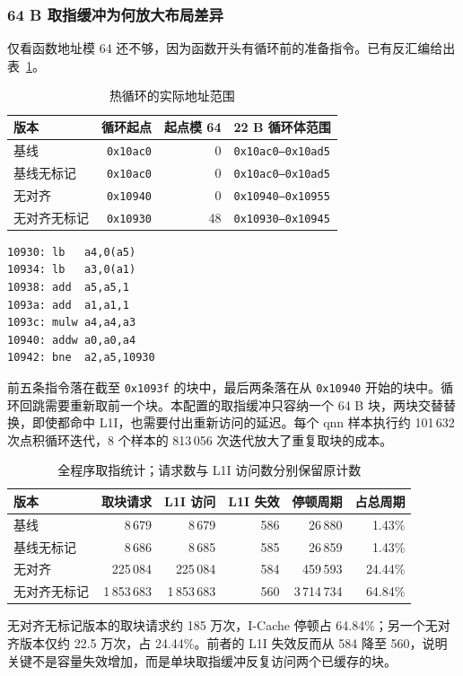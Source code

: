 \documentclass[12pt,a4paper,fontset=mac]{ctexart}
\begin{document}
\subsubsection{64 B 取指缓冲为何放大布局差异}
仅看函数地址模 64 还不够，因为函数开头有循环前的准备指令。已有反汇编给出表~\ref{tab:loop}。
\begin{table}[H]\centering\small
\caption{热循环的实际地址范围}\label{tab:loop}
\begin{tabular}{lrrl}\toprule
版本 & 循环起点 & 起点模 64 & 22 B 循环体范围 \\\midrule
基线 & \texttt{0x10ac0} & 0 & \texttt{0x10ac0--0x10ad5} \\
基线无标记 & \texttt{0x10ac0} & 0 & \texttt{0x10ac0--0x10ad5} \\
无对齐 & \texttt{0x10940} & 0 & \texttt{0x10940--0x10955} \\
无对齐无标记 & \texttt{0x10930} & 48 & \texttt{0x10930--0x10945} \\\bottomrule
\end{tabular}\end{table}
\begin{lstlisting}[language={},caption={无对齐无标记版本的热循环反汇编节选}]
10930: lb   a4,0(a5)
10934: lb   a3,0(a1)
10938: add  a5,a5,1
1093a: add  a1,a1,1
1093c: mulw a4,a4,a3
10940: addw a0,a0,a4
10942: bne  a2,a5,10930
\end{lstlisting}
前五条指令落在截至 \texttt{0x1093f} 的块中，最后两条落在从 \texttt{0x10940} 开始的块中。循环回跳需要重新取前一个块。本配置的取指缓冲只容纳一个 64 B 块，两块交替替换，即使都命中 L1I，也需要付出重新访问的延迟。每个 qnn 样本执行约 101\,632 次点积循环迭代，8 个样本的 813\,056 次迭代放大了重复取块的成本。

\begin{table}[H]\centering\scriptsize
\caption{全程序取指统计；请求数与 L1I 访问数分别保留原计数}\label{tab:fetch}
\begin{tabular}{lrrrrr}\toprule
版本 & 取块请求 & L1I 访问 & L1I 失效 & 停顿周期 & 占总周期 \\\midrule
基线 & 8\,679 & 8\,679 & 586 & 26\,880 & 1.43\% \\
基线无标记 & 8\,686 & 8\,685 & 585 & 26\,859 & 1.43\% \\
无对齐 & 225\,084 & 225\,084 & 584 & 459\,593 & 24.44\% \\
无对齐无标记 & 1\,853\,683 & 1\,853\,683 & 560 & 3\,714\,734 & 64.84\% \\
\bottomrule\end{tabular}\end{table}
无对齐无标记版本的取块请求约 185 万次，I-Cache 停顿占 64.84\%；另一个无对齐版本仅约 22.5 万次，占 24.44\%。前者的 L1I 失效反而从 584 降至 560，说明关键不是容量失效增加，而是单块取指缓冲反复访问两个已缓存的块。
\end{document}
